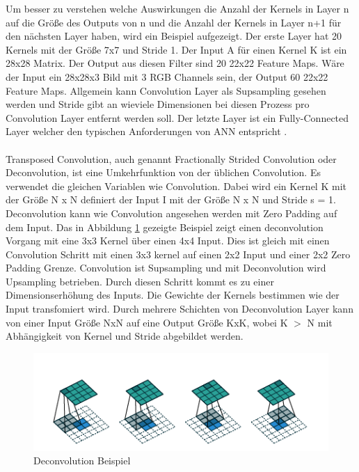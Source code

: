 \documentclass{llncs}
\begin{document}
Um  besser zu verstehen welche Auswirkungen die Anzahl der Kernels in Layer n auf die Größe des Outputs von n und die Anzahl der Kernels in Layer n+1 für den nächsten Layer haben, wird ein Beispiel aufgezeigt. Der erste Layer hat 20 Kernels mit der Größe 7x7 und Stride 1. Der Input A für einen Kernel K ist ein 28x28 Matrix. Der Output aus diesen Filter sind 20 22x22 Feature Maps. Wäre der Input ein 28x28x3 Bild mit 3 RGB Channels sein, der Output 60 22x22 Feature Maps. Allgemein kann Convolution Layer als Supsampling gesehen werden und Stride gibt an wieviele Dimensionen bei diesen Prozess pro Convolution Layer entfernt werden soll. Der letzte Layer ist ein Fully-Connected Layer welcher den typischen Anforderungen von ANN entspricht \cite{conv}.  
\\\\
Transposed Convolution, auch genannt Fractionally Strided Convolution oder Deconvolution, ist eine Umkehrfunktion von der üblichen Convolution. Es verwendet die gleichen Variablen wie Convolution. Dabei wird ein Kernel K mit der Größe N x N definiert der Input I mit der Größe N x N und Stride s = 1. Deconvolution kann wie Convolution angesehen werden mit  Zero Padding auf dem Input.  Das in Abbildung \ref{fig:Bild12} gezeigte Beispiel zeigt einen deconvolution Vorgang mit eine 3x3 Kernel über einen 4x4 Input. Dies ist gleich mit einen Convolution Schritt mit einen 3x3 kernel auf einen 2x2 Input und einer 2x2 Zero Padding Grenze. Convolution ist Supsampling und mit Deconvolution wird Upsampling betrieben. Durch diesen Schritt kommt es zu einer Dimensionserhöhung des Inputs. Die Gewichte der Kernels bestimmen wie der Input transfomiert wird. Durch mehrere Schichten von Deconvolution Layer kann von einer Input Größe NxN auf eine Output Größe KxK, wobei K $>$ N mit Abhängigkeit von Kernel und Stride abgebildet werden\cite{conv}. 

\begin{figure}[htbp] 
	\centering
	\includegraphics[width=1.0\textwidth]{decon.png}
	\caption{Deconvolution Beispiel \protect\cite{conv}}
	\label{fig:Bild12}
\end{figure}
\newpage
\end{document}
